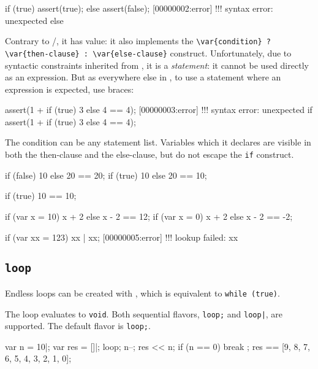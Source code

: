 \begin{urbiscript}
if (true)
  assert(true);
else
  assert(false);
[00000002:error] !!! syntax error: unexpected else
\end{urbiscript}

Contrary to \langC/\Cxx, it has value: it also implements the
\lstinline|\var{condition} ? \var{then-clause} : \var{else-clause}|
construct.  Unfortunately, due to syntactic constraints inherited from \langC,
it is a \emph{statement}: it cannot be used directly as an expression.  But
as everywhere else in \us, to use a statement where an expression is
expected, use braces:

\begin{urbiscript}
assert(1 + if (true) 3 else 4 == 4);
[00000003:error] !!! syntax error: unexpected if
assert(1 + { if (true) 3 else 4 } == 4);
\end{urbiscript}

The condition can be any statement list.  Variables which it declares are
visible in both the then-clause and the else-clause, but do not escape the
\lstinline{if} construct.

\begin{urbiassert}
{if (false) 10 else 20} == 20;
{if (true)  10 else 20} == 10;

{if (true) 10         } == 10;

{if (var x = 10) x + 2 else x - 2} == 12;
{if (var x = 0)  x + 2 else x - 2} == -2;

{if (var xx = 123) xx | xx};
[00000005:error] !!! lookup failed: xx
\end{urbiassert}


\subsection{\lstinline{loop}}
\label{sec:lang:loop}

Endless loops can be created with , which is equivalent to
\lstinline|while (true)|.


The loop evaluates to \lstinline{void}.  Both sequential flavors,
\lstinline|loop;| and \lstinline'loop|', are supported.  The default flavor
is \lstinline|loop;|.

\begin{urbiassert}
{
  var n = 10|;
  var res = []|;
  loop;
  {
    n--;
    res << n;
    if (n == 0)
      break
  };
  res
}
==
[9, 8, 7, 6, 5, 4, 3, 2, 1, 0];
\end{urbiassert}

